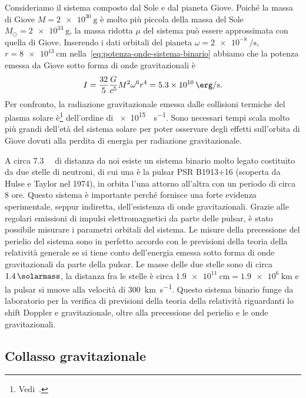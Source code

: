 Consideriamo il sistema composto dal Sole e dal pianeta Giove.  Poiché la massa
di Giove $M = \SI{2e30}{\gram}$ è molto più piccola della massa del Sole
$M_{\odot} = \SI{2e33}{\gram}$, la massa ridotta $\mu$ del sistema può essere
approssimata con quella di Giove.  Inserendo i dati orbitali del pianeta
$\omega = \SI[per-mode=reciprocal]{2e-8}{\per\second}$,
$r = \SI{8e13}{\centi\metre}$ nella~\eqref{eq:potenza-onde-sistema-binario}
abbiamo che la potenza emessa da Giove sotto forma di onde gravitazionali è
\begin{equation}
  I = \frac{32}{5} \frac{G}{c^{5}} M^{2} \omega^{6} r^{4} =
  \SI{5.3e10}{\erg\per\second}.
\end{equation}
Per confronto, la radiazione gravitazionale emessa dalle collisioni termiche del
plasma solare è\footnote{Vedi~\textcite[266]{weinberg:gravitation}.}
dell'ordine di \SI{e15}{\erg\per\second}.  Sono necessari tempi scala molto più
grandi dell'età del sistema solare per poter osservare degli effetti sull'orbita
di Giove dovuti alla perdita di energia per radiazione gravitazionale.

A circa \SI{7.3}{\kilo\parsec} di distanza da noi esiste un sistema binario
molto legato costituito da due stelle di neutroni, di cui una è la pulsar PSR
B1913+16 (scoperta da Hulse e Taylor nel 1974), in orbita l'una attorno
all'altra con un periodo di circa $8$ ore.  Questo sistema è importante perché
fornisce una forte evidenza sperimentale, seppur indiretta, dell'esistenza di
onde gravitazionali.  Grazie alle regolari emissioni di impulsi elettromagnetici
da parte delle pulsar, è stato possibile misurare i parametri orbitali del
sistema.  Le misure della precessione del perielio del sistema sono in perfetto
accordo con le previsioni della teoria della relatività generale se si tiene
conto dell'energia emessa sotto forma di onde gravitazionali da parte della
pulsar.  Le masse delle due stelle sono di circa $\SI{1.4}{\solarmass}$, la
distanza fra le stelle è circa
$\SI{1.9e11}{\centi\metre} = \SI{1.9e6}{\kilo\metre}$ e la pulsar si muove alla
velocità di \SI{300}{\kilo\metre\per\second}.  Questo sistema binario funge da
laboratorio per la verifica di previsioni della teoria della relatività
riguardanti lo shift Doppler e gravitazionale, oltre alla precessione del
perielio e le onde gravitazionali.

\subsection{Collasso gravitazionale}
\label{sec:collasso-grav}

